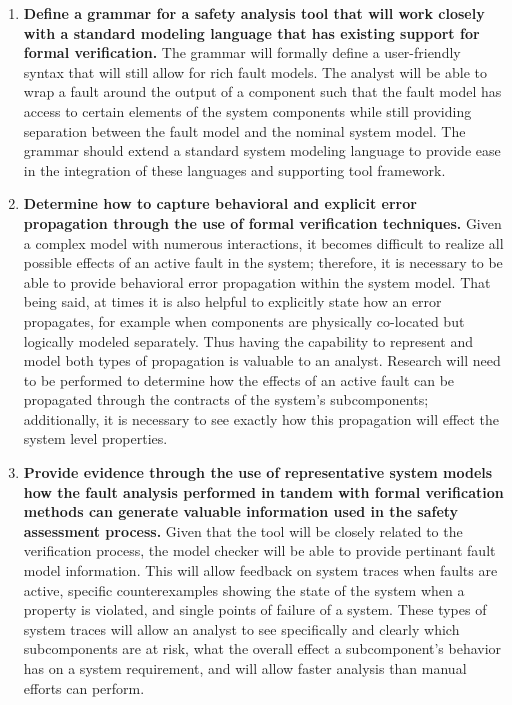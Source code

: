 \begin{enumerate}
\item \textbf{Define a grammar for a safety analysis tool that will work closely with a standard modeling language that has existing support for formal verification.} The grammar will formally define a user-friendly syntax that will still allow for rich fault models. The analyst will be able to wrap a fault around the output of a component such that the fault model has access to certain elements of the system components while still providing separation between the fault model and the nominal system model. The grammar should extend a standard system modeling language to provide ease in the integration of these languages and supporting tool framework. 

\item \textbf{Determine how to capture behavioral and explicit error propagation through the use of formal verification techniques.} Given a complex model with numerous interactions, it becomes difficult to realize all possible effects of an active fault in the system; therefore, it is necessary to be able to provide behavioral error propagation within the system model. That being said, at times it is also helpful to explicitly state how an error propagates, for example when components are physically co-located but logically modeled separately. Thus having the capability to represent and model both types of propagation is valuable to an analyst. Research will need to be performed to determine how the effects of an active fault can be propagated through the contracts of the system's subcomponents; additionally, it is necessary to see exactly how this propagation will effect the system level properties. 

\item \textbf{Provide evidence through the use of representative system models how the fault analysis performed in tandem with formal verification methods can generate valuable information used in the safety assessment process.} Given that the tool will be closely related to the verification process, the model checker will be able to provide pertinant fault model information. This will allow feedback on system traces when faults are active, specific counterexamples showing the state of the system when a property is violated, and single points of failure of a system. These types of system traces will allow an analyst to see specifically and clearly which subcomponents are at risk, what the overall effect a subcomponent's behavior has on a system requirement, and will allow faster analysis than manual efforts can perform. 


\end{enumerate}
